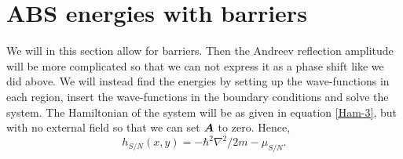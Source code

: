 \section{ABS energies with barriers}
\label{sec:withBarriers}
We will in this section allow for barriers. Then the Andreev reflection amplitude will be more complicated so that we can not express it as a phase shift like we did above. We will instead find the energies by setting up the wave-functions in each region, insert the wave-functions in the boundary conditions and solve the system. The Hamiltonian of the system will be as given in equation \eqref{Ham-3}, but with no external field so that we can set $\boldsymbol{A}$ to zero. Hence, 
\begin{equation}
h_{S/N}(x,y) = -\hbar^2\nabla^2/2m -\mu_{S/N}.
\label{HamSN}
\end{equation}


